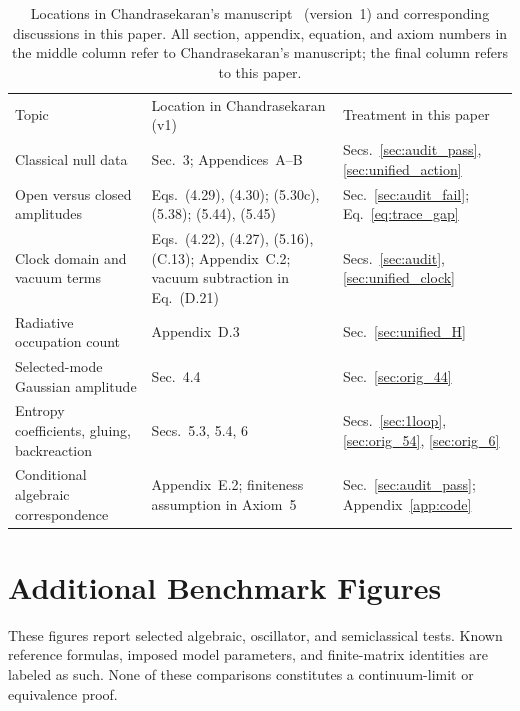 \documentclass[onecolumn,11pt,aps,prd,amsmath,amssymb,nofootinbib,floatfix]{revtex4-2}
\begin{document}
\begin{table}[t]
\caption{Locations in Chandrasekaran's manuscript~\cite{Chandrasekaran2026} (version~1) and corresponding discussions in this paper. All section, appendix, equation, and axiom numbers in the middle column refer to Chandrasekaran's manuscript; the final column refers to this paper.}
\begin{ruledtabular}
\small
\begin{tabular}{p{}p{}p{}}
Topic & Location in Chandrasekaran (v1) & Treatment in this paper \\
\colrule
Classical null data & Sec.~3; Appendices~A--B & Secs.~\ref{sec:audit_pass}, \ref{sec:unified_action} \\
Open versus closed amplitudes & Eqs.~(4.29), (4.30); (5.30c), (5.38); (5.44), (5.45) & Sec.~\ref{sec:audit_fail}; Eq.~\eqref{eq:trace_gap} \\
Clock domain and vacuum terms & Eqs.~(4.22), (4.27), (5.16), (C.13); Appendix~C.2; vacuum subtraction in Eq.~(D.21) & Secs.~\ref{sec:audit}, \ref{sec:unified_clock} \\
Radiative occupation count & Appendix~D.3 & Sec.~\ref{sec:unified_H} \\
Selected-mode Gaussian amplitude & Sec.~4.4 & Sec.~\ref{sec:orig_44} \\
Entropy coefficients, gluing, backreaction & Secs.~5.3, 5.4, 6 & Secs.~\ref{sec:1loop}, \ref{sec:orig_54}, \ref{sec:orig_6} \\
Conditional algebraic correspondence & Appendix~E.2; finiteness assumption in Axiom~5 & Sec.~\ref{sec:audit_pass}; Appendix~\ref{app:code} \\
\end{tabular}
\end{ruledtabular}
\end{table}

\ifdefined\ReadingVersion\else\onecolumngrid\fi
\section{Additional Benchmark Figures}\label{app:benchmark_figures}

These figures report selected algebraic, oscillator, and semiclassical tests. Known reference formulas, imposed model parameters, and finite-matrix identities are labeled as such. None of these comparisons constitutes a continuum-limit or equivalence proof.
\end{document}
